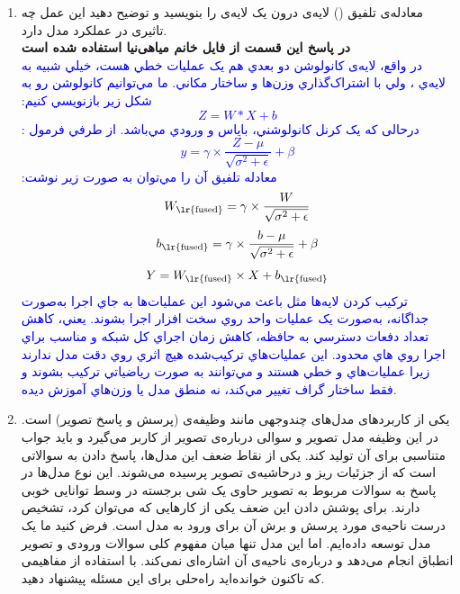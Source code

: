 \documentclass[12pt]{article}
\begin{document}
\begin{enumerate}
\begin{enumerate}
\begin{itemize}
{            }
        \end{itemize}
        \item معادله‌ی تلفیق () لایه‌ی  درون یک لایه‌ی  را بنویسید و توضیح دهید این عمل چه تاثیری در عملکرد مدل دارد.\\
        \textbf{در پاسخ این قسمت از فایل خانم میاهی‌نیا استفاده شده است}\\
        \textcolor{blue}{
        در واقع، لایه‌ی کانولوشن دو بعدي هم يک عمليات خطي هست، خيلي شبيه به لایه‌ي ، ولي با اشتراک‌گذاري وزن‌ها و ساختار مکاني. ما مي‌توانیم کانولوشن رو به شکل زير بازنويسي کنيم:
           $$Z = W * X + b$$
        درحالی که  يک کرنل کانولوشني،   باياس و   ورودي مي‌باشد.
        از طرفي فرمول :
        $$y = \gamma \times \frac{Z - \mu}{\sqrt{\sigma^2 + \epsilon}} + \beta$$
        معادله تلفيق آن را مي‌توان به صورت زير نوشت:
        $$W_{\text{\lr{fused}}} = \gamma \times \frac{W}{\sqrt{\sigma^2 + \epsilon}}$$
        $$b_{\text{\lr{fused}}} = \gamma \times \frac{b - \mu}{\sqrt{\sigma^2 + \epsilon}} + \beta$$
        $$Y = W_{\text{\lr{fused}}} \times X + b_{\text{\lr{fused}}}$$
        ترکيب کردن لایه‌ها مثل   باعث مي‌شود اين عمليات‌ها به جاي اجرا به‌صورت جداگانه، به‌صورت يک عمليات واحد روي سخت افزار اجرا بشوند. يعني، کاهش تعداد دفعات دسترسي به حافظه، کاهش زمان اجراي کل شبکه و مناسب براي اجرا روي  هاي محدود.
        اين عمليات‌هاي ترکيب‌شده هيچ اثري روي دقت مدل ندارند زيرا عمليات‌هاي   و   خطي 
        هستند و مي‌توانند به صورت رياضياتي ترکيب بشوند و فقط ساختار گراف تغيير مي‌کند، نه منطق مدل يا وزن‌هاي آموزش ديده.
        }
        \item یکی از کاربردهای مدل‌های چندوجهی  مانند  وظیفه‌ی   (پرسش و پاسخ تصویر) است. در این وظیفه مدل تصویر و سوالی درباره‌ی تصویر از کاربر می‌گیرد و باید جواب متناسبی برای آن تولید کند. یکی از نقاط ضعف این مدل‌ها، پاسخ دادن به سوالاتی است که از جزئیات ریز و درحاشیه‌ی تصویر پرسیده می‌شوند. این نوع مدل‌ها در پاسخ به سوالات مربوط به تصویر حاوی یک شی برجسته در وسط توانایی خوبی دارند. برای پوشش دادن این ضعف یکی از کارهایی که می‌توان کرد، تشخیص درست ناحیه‌ی مورد پرسش و برش آن برای ورود به مدل است. فرض کنید ما یک مدل  توسعه داده‌ایم. اما این مدل تنها میان مفهوم کلی سوالات ورودی و تصویر انطباق انجام می‌دهد و درباره‌ی ناحیه‌ی آن اشاره‌ای نمی‌کند. با استفاده از مفاهیمی که تاکنون خوانده‌اید راه‌حلی برای این مسئله پیشنهاد دهید.\\

\end{enumerate}
\end{enumerate}
\end{document}
